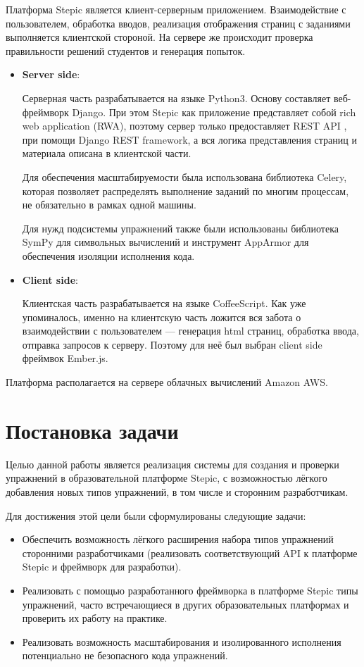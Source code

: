 \documentclass{matmex-diploma-custom}
\begin{document}
Платформа Stepic является клиент-серверным приложением. Взаимодействие
с пользователем, обработка вводов, реализация отображения страниц с
заданиями выполняется клиентской стороной. На сервере же происходит
проверка правильности решений студентов и генерация попыток.
\begin{itemize}
\item \textbf{Server side}:

  Серверная часть разрабатывается на языке Python3. Основу составляет
  веб-фреймворк Django. При этом Stepic как приложение представляет
  собой rich web application (RWA), поэтому сервер только
  предоставляет REST API \cite{rest}, при помощи Django REST
  framework, а вся логика представления страниц и материала описана в
  клиентской части.

  Для обеспечения масштабируемости была использована библиотека
  Celery, которая позволяет распределять выполнение заданий по многим
  процессам, не обязательно в рамках одной машины.

  Для нужд подсистемы упражнений также были использованы библиотека
  SymPy для символьных вычислений и инструмент AppArmor для
  обеспечения изоляции исполнения кода.
\item \textbf{Client side}:

  Клиентская часть разрабатывается на языке CoffeeScript. Как уже
  упоминалось, именно на клиентскую часть ложится вся забота о
  взаимодействии с пользователем --- генерация html страниц, обработка
  ввода, отправка запросов к серверу. Поэтому для неё был выбран
  client side фреймвок Ember.js.
\end{itemize}

Платформа располагается на сервере облачных вычислений Amazon AWS.
\section{Постановка задачи}
Целью данной работы является реализация системы для создания и
проверки упражнений в образовательной платформе Stepic, с возможностью
лёгкого добавления новых типов упражнений, в том числе и сторонним
разработчикам.

Для достижения этой цели были сформулированы следующие задачи:

\begin{itemize}
\item Обеспечить возможность лёгкого расширения набора типов
  упражнений сторонними разработчиками (реализовать соответствующий
  API к платформе Stepic и фреймворк для разработки).
\item Реализовать с помощью разработанного фреймворка в платформе
  Stepic типы упражнений, часто встречающиеся в других образовательных
  платформах и проверить их работу на практике.
\item Реализовать возможность масштабирования и изолированного
  исполнения потенциально не безопасного кода упражнений.
\end{itemize}
\end{document}
